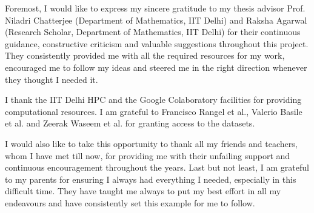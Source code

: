 
Foremost, I would like to express my sincere gratitude to my thesis advisor Prof. Niladri Chatterjee (Department of Mathematics, IIT Delhi) and Raksha Agarwal (Research Scholar, Department of Mathematics, IIT Delhi) for their continuous guidance, constructive criticism and valuable suggestions throughout this project.
They consistently provided me with all the required resources for my work, encouraged me to follow my ideas and steered me in the right direction whenever they thought I needed it.

I thank the IIT Delhi HPC and the Google Colaboratory facilities for providing computational resources. I am grateful to Francisco Rangel et al., Valerio Basile et al. and Zeerak Waseem et al. for granting access to the datasets.


I would also like to take this opportunity to thank all my friends and teachers, whom I have met till now, for providing me with their unfailing support and continuous encouragement throughout the years. Last but not least, I am grateful to my parents for ensuring I always had everything I needed, especially in this difficult time. They have taught me always to put my best effort in all my endeavours and have consistently set this example for me to follow.







